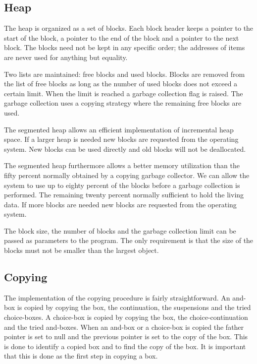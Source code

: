 \subsection*{Heap}

The heap is organized as a set of blocks. Each block header 
keeps a pointer to the start of the block, a pointer to the end 
of the block and a pointer to the next block.  The blocks need 
not be kept in any specific order; the addresses of items are 
never used for anything but equality.

Two lists are maintained: free blocks and used blocks.  Blocks are
removed from the list of free blocks as long as the number of used
blocks does not exceed a certain limit.  When the limit is reached a
garbage collection flag is raised. The garbage collection uses a
copying strategy where the remaining free blocks are used.

The segmented heap allows an efficient implementation of 
incremental heap space. If a larger heap is needed new blocks 
are requested from the operating system. New blocks can be 
used directly and old blocks will not be deallocated.  

The segmented heap furthermore  allows a better memory 
utilization than the fifty percent normally obtained by a 
copying garbage collector.  We can allow the system to use up 
to eighty percent of the blocks before a garbage collection is 
performed. The remaining twenty percent normally 
sufficient to hold the living data. If more blocks are needed 
new blocks are requested from the operating system.

The block size, the number of blocks and the garbage collection limit can be 
passed as parameters to the program. The only requirement is 
that the size of the blocks must not be smaller than the largest 
object. 

\subsection*{Copying} \label{implcopy}

The implementation of the copying procedure is fairly straightforward.
An and-box is copied by copying the box, the continuation, the
suspensions and the tried choice-boxes.  A choice-box is copied by
copying the box, the choice-continuation and the tried and-boxes.
When an and-box or a choice-box is copied the father pointer is set to
null and the previous pointer is set to the copy of the box. This is
done to identify a copied box and to find the copy of the box. It is
important that this is done as the first step in copying a box.

